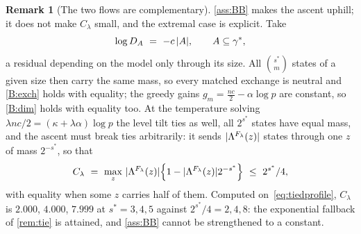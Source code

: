 \documentclass[aos]{imsart}
\DeclarePairedDelimiter{\abs}{\lvert}{\rvert}
\theoremstyle{plain}
\theoremstyle{definition}
\newtheorem{remark}{Remark}[section]
\begin{document}
    \begin{remark}[The two flows are complementary]
        \label{rem:extremal}
        \cref{ass:BB} makes the ascent uphill; it does not make $C_\lambda$
        small, and the extremal case is explicit. Take
        \begin{equation}
            \label{eq:tiedprofile}
            \log D_A\ =\ -c\,\abs A,\qquad A\subseteq\gamma^{\ast},
        \end{equation}
        a residual depending on the model only through its size. All
        $\binom{s^{\ast}}m$ states of a given size then carry the same mass,
        so every matched exchange is neutral and \ref{B:exch} holds with
        equality; the greedy gains $g_m=\tfrac{nc}2-\alpha\log p$ are
        constant, so \ref{B:dim} holds with equality too. At the temperature
        solving $\lambda nc/2=(\kappa+\lambda\alpha)\log p$ the level tilt
        ties as well, all $2^{s^{\ast}}$ states have equal mass, and the
        ascent must break ties arbitrarily: it sends
        $\abs{\Lambda^{F_\lambda}(z)}$ states through one $z$ of mass
        $2^{-s^{\ast}}$, so that
        \begin{equation}
            \label{eq:extremal}
            C_\lambda\ =\ \max_z\ \abs{\Lambda^{F_\lambda}(z)}
            \Bigl\{1-\abs{\Lambda^{F_\lambda}(z)}2^{-s^{\ast}}\Bigr\}
            \ \leq\ 2^{s^{\ast}}/4 ,
        \end{equation}
        with equality when some $z$ carries half of them. Computed
        on~\eqref{eq:tiedprofile}, $C_\lambda$ is $2.000$, $4.000$, $7.999$
        at $s^{\ast}=3,4,5$ against $2^{s^{\ast}}/4=2,4,8$: the exponential
        fallback of \cref{rem:tie} is attained, and \cref{ass:BB} cannot be
        strengthened to a constant.


\end{remark}
\end{document}
